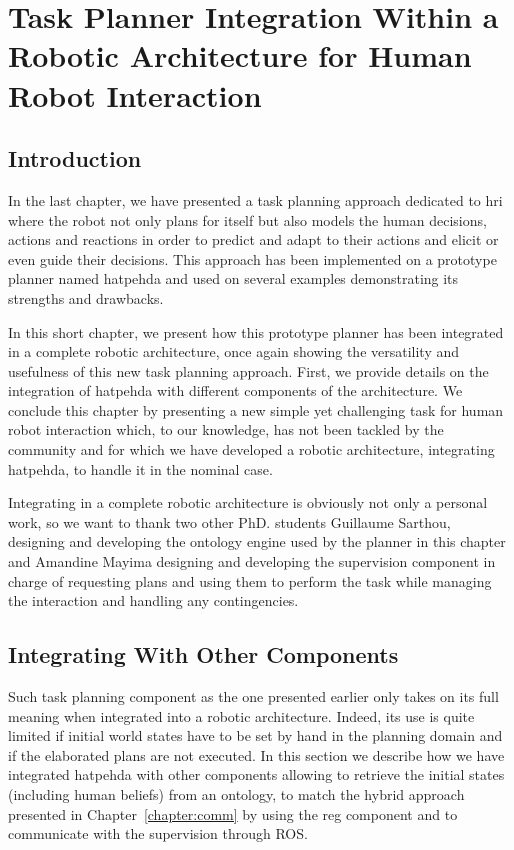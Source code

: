 \documentclass[a4paper,11pt,twoside]{StyleThese}
\begin{document}
\setcounter{chapter}{4} %
\dominitoc
\faketableofcontents
\fi

\chapter{Task Planner Integration Within a Robotic Architecture for Human Robot Interaction}
\label{chapter:integration}
\minitoc

\section{Introduction}
In the last chapter, we have presented a task planning approach dedicated to \acrshort{hri} where the robot not only plans for itself but also models the human decisions, actions and reactions in order to predict and adapt to their actions and elicit or even guide their decisions. This approach has been implemented on a prototype planner named \acrfull{hatpehda} and used on several examples demonstrating its strengths and drawbacks.

In this short chapter, we present how this prototype planner has been integrated in a complete robotic architecture, once again showing the versatility and usefulness of this new task planning approach. First, we provide details on the integration of \acrshort{hatpehda} with different components of the architecture. We conclude this chapter by presenting a new simple yet challenging task for human robot interaction which, to our knowledge, has not been tackled by the community and for which we have developed a robotic architecture, integrating \acrshort{hatpehda}, to handle it in the nominal case.

Integrating in a complete robotic architecture is obviously not only a personal work, so we want to thank two other PhD. students Guillaume Sarthou, designing and developing the ontology engine used by the planner in this chapter and Amandine Mayima designing and developing the supervision component in charge of requesting plans and using them to perform the task while managing the interaction and handling any contingencies.

\section{Integrating With Other Components}
\label{sec:chap5integratingwithothers}

Such task planning component as the one presented earlier only takes on its full meaning when integrated into a robotic architecture. Indeed, its use is quite limited if initial world states have to be set by hand in the planning domain and if the elaborated plans are not executed. In this section we describe how we have integrated \acrshort{hatpehda} with other components allowing to retrieve the initial states (including human beliefs) from an ontology, to match the hybrid approach presented in Chapter~\ref{chapter:comm} by using the \acrshort{reg} component and to communicate with the supervision through ROS.
\end{document}
